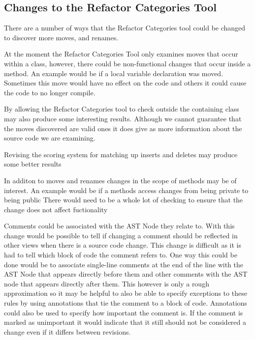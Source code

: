 \subsection{Changes to the Refactor Categories Tool}
There are a number of ways that the Refactor Categories tool could be changed to discover more moves, and renames.

At the moment the Refactor Categories Tool only examines moves that occur within a class, however, there could be non-functional changes that occur inside a method. 
An example would be if a local variable declaration was moved.
Sometimes this move would have no effect on the code and others it could cause the code to no longer compile.

By allowing the Refactor Categories tool to check outside the containing class may also produce some interesting results.
Although we cannot guarantee that the moves discovered are valid ones it does give as more information about the source code we are examining.

Revising the scoring system for matching up inserts and deletes may produce some better results

In additon to moves and renames changes in the scope of methods may be of interest.
An example would be if a methods access changes from being private to being public
There would need to be a whole lot of checking to ensure that the change does not affect fuctionality

Comments could be associated with the AST Node they relate to.  
With this change would be possible to tell if changing a comment should be reflected in other views when there is a source code change. 
This change is difficult as it is had to tell which block of code the comment refers to.  
One way this could be done would be to associate single-line comments at the end of the line with the AST Node that appears directly before them and other comments with the AST node that appears directly after them.  
This however is only a rough approximation so it may be helpful to also be able to specify exceptions to these rules by using annotations that tie the comment to a block of code. Annotations could also be used to specify how important the comment is.
If the comment is marked as unimportant it would indicate that it still should not be considered a change even if it differs between revisions.

